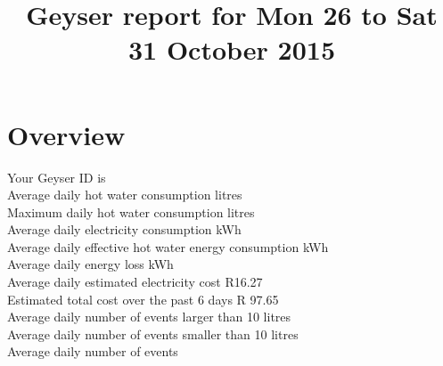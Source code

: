 \documentclass{article}\usepackage[]{graphicx}\usepackage[]{color}
\title{Geyser report for Mon 26 to Sat 31 October 2015} %
\date{\vspace{-5ex}} %
\begin{document}
\maketitle %




\section{Overview}

Your Geyser ID is  \\

Average daily hot water consumption  litres\\
Maximum daily hot water consumption  litres\\


Average daily electricity consumption   kWh\\
Average daily effective hot water energy consumption  kWh\\
Average daily energy loss  kWh\\

Average daily estimated electricity cost \dotfill R16.27\\
Estimated total cost over the past 6 days \dotfill R 97.65\\

Average daily number of events larger than 10 litres\\
Average daily number of events smaller than 10 litres\\
Average daily number of events \\
\end{document}
